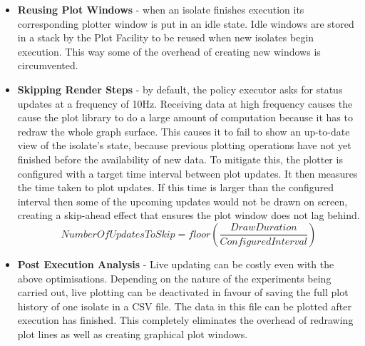 \documentclass{l4proj}
\begin{document}
\begin{itemize}
\item \textbf{Reusing Plot Windows} - when an isolate finishes execution its corresponding plotter window is put in an idle state. Idle windows are stored in a stack by the Plot Facility to be reused when new isolates begin execution. This way some of the overhead of creating new windows is circumvented. 

\item \textbf{Skipping Render Steps} - by default, the policy executor asks for status updates at a frequency of 10Hz. Receiving data at high frequency causes the cause the plot library to do a large amount of computation because it has to redraw the whole graph surface. This causes it to fail to show an up-to-date view of the isolate's state, because previous plotting operations have not yet finished before the availability of new data. To mitigate this, the plotter is configured with a target time interval between plot updates. It then measures the time taken to plot updates. If this time is larger than the configured interval then some of the upcoming updates would not be drawn on screen, creating a skip-ahead effect that ensures the plot window does not lag behind.
\begin{equation}
  \textit{NumberOfUpdatesToSkip} = floor\left(\dfrac{\textit{DrawDuration}}{\textit{ConfiguredInterval}}\right)
\end{equation}

\item \textbf{Post Execution Analysis} - Live updating can be costly even with the above optimisations. Depending on the nature of the experiments being carried out, live plotting can be deactivated in favour of saving the full plot history of one isolate in a CSV file. The data in this file can be plotted after execution has finished. This completely eliminates the overhead of redrawing plot lines as well as creating graphical plot windows. 
\end{itemize}
\end{document}
